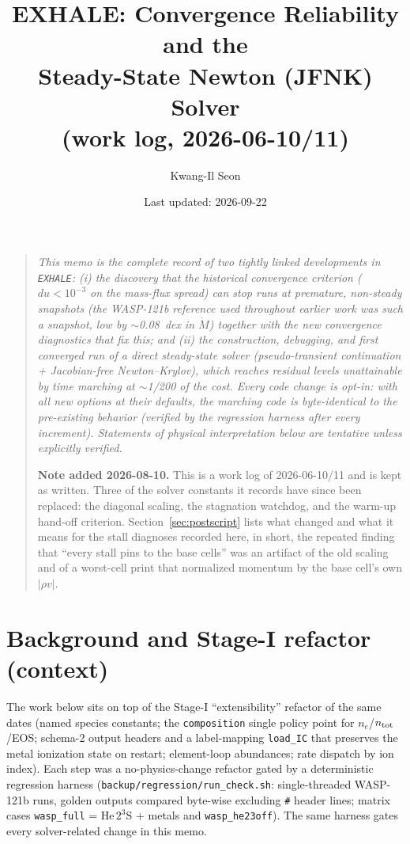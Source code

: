 \documentclass[english,a4paper]{my_memo}
\newcommand{\code}[1]{\texttt{#1}}
\begin{document}
\title{EXHALE: Convergence Reliability and the\\ Steady-State Newton
(JFNK) Solver\\ \large(work log, 2026-06-10/11)}
\author{Kwang-Il Seon}
\date{Last updated: 2026-09-22}
\maketitle

\begin{quote}\small\itshape
This memo is the complete record of two tightly linked developments in
\code{EXHALE}: (i) the discovery that the historical convergence
criterion ($du<10^{-3}$ on the mass-flux spread) can stop runs at
\emph{premature, non-steady} snapshots (the WASP-121b reference used
throughout earlier work was such a snapshot, low by $\sim$0.08~dex in
$\dot M$) together with the new convergence diagnostics that fix this;
and (ii) the construction, debugging, and first \emph{converged} run of a
direct steady-state solver (pseudo-transient continuation + Jacobian-free
Newton--Krylov), which reaches residual levels unattainable by time
marching at $\sim$1/200 of the cost. Every code change is opt-in: with all
new options at their defaults, the marching code is byte-identical to the
pre-existing behavior (verified by the regression harness after every
increment). Statements of physical interpretation below are tentative
unless explicitly verified.

\medskip
\textbf{Note added 2026-08-10.} This is a work log of 2026-06-10/11 and is kept
as written. Three of the solver constants it records have since been replaced:
the diagonal scaling, the stagnation watchdog, and the warm-up hand-off
criterion. Section~\ref{sec:postscript} lists what changed and what it means for
the stall diagnoses recorded here, in short, the repeated finding that
``every stall pins to the base cells'' was an artifact of the old scaling and of
a worst-cell print that normalized momentum by the base cell's own $|\rho v|$.
\end{quote}

\tableofcontents

\section{Background and Stage-I refactor (context)}\label{sec:bg}

The work below sits on top of the Stage-I ``extensibility'' refactor of the
same dates (named species constants; the \code{composition} single policy
point for $n_e$/$n_{\rm tot}$/EOS; schema-2 output headers and a
label-mapping \code{load\_IC} that preserves the metal ionization state on
restart; element-loop abundances; rate dispatch by ion index). Each step was
a no-physics-change refactor gated by a deterministic regression harness
(\code{backup/regression/run\_check.sh}: single-threaded WASP-121b runs, golden
outputs compared byte-wise excluding \code{\#} header lines; matrix cases
\code{wasp\_full} = He\,$2^3$S + metals and \code{wasp\_he23off}).
The same harness gates every
solver-related change in this memo.
\end{document}
